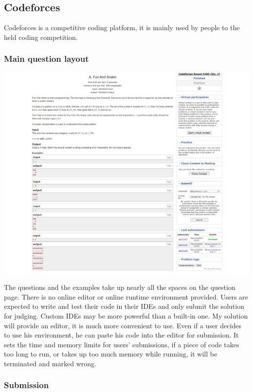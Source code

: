\documentclass[a4paper]{report}
\begin{document}
\subsection{Codeforces}

Codeforces is a competitive coding platform, it is mainly used by people to the held coding competition.

\subsubsection{Main question layout}

\includegraphics[width=\linewidth]{Problem-A-Codeforces}

The questions and the examples take up nearly all the spaces on the question page. There is no online editor or online runtime environment provided. Users are expected to write and test their code in their IDEs and only submit the solution for judging. Custom IDEs may be more powerful than a built-in one. My solution will provide an editor, it is much more convenient to use. Even if a user decides to use his environment, he can paste his code into the editor for submission. It sets the time and memory limits for users' submissions, if a piece of code takes too long to run, or takes up too much memory while running, it will be terminated and marked wrong.

\subsubsection{Submission}
\end{document}
